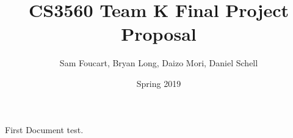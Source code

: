 \documentclass[12pt, letterpaper]{article}
\title{CS3560 Team K Final Project Proposal}
\author{Sam Foucart, Bryan Long, Daizo Mori, Daniel Schell}
\date{Spring 2019}
\begin{document}
First Document test.
\end{document}

